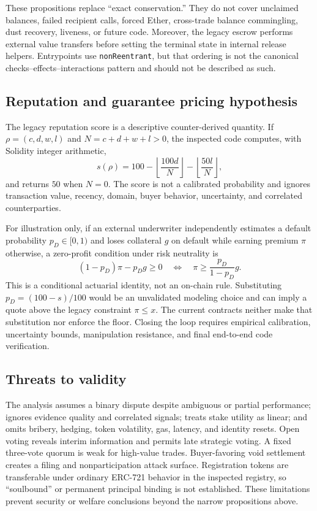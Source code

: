 These propositions replace ``exact conservation.'' They do not cover unclaimed balances, failed
recipient calls, forced Ether, cross-trade balance commingling, dust recovery, liveness, or future
code. Moreover, the legacy escrow performs external value transfers before setting the terminal
state in internal release helpers. Entrypoints use \texttt{nonReentrant}, but that ordering is not the
canonical checks--effects--interactions pattern and should not be described as such.

\subsection{Reputation and guarantee pricing hypothesis}
\label{sec:pricing}

The legacy reputation score is a descriptive counter-derived quantity. If
$\rho=(c,d,w,l)$ and $N=c+d+w+l>0$, the inspected code computes, with Solidity integer arithmetic,
\[
  s(\rho)=100-\left\lfloor\frac{100d}{N}\right\rfloor
             -\left\lfloor\frac{50l}{N}\right\rfloor,
\]
and returns $50$ when $N=0$. The score is not a calibrated probability and ignores transaction
value, recency, domain, buyer behavior, uncertainty, and correlated counterparties.

For illustration only, if an external underwriter independently estimates a default probability
$p_D\in[0,1)$ and loses collateral $g$ on default while earning premium $\pi$ otherwise, a zero-profit
condition under risk neutrality is
\[
 (1-p_D)\pi-p_Dg\ge0
 \quad\Longleftrightarrow\quad
 \pi\ge\frac{p_D}{1-p_D}g.
\]
This is a conditional actuarial identity, not an on-chain rule. Substituting
$p_D=(100-s)/100$ would be an unvalidated modeling choice and can imply a quote above the legacy
constraint $\pi\le x$. The current contracts neither make that substitution nor enforce the floor.
Closing the loop requires empirical calibration, uncertainty bounds, manipulation resistance, and
final end-to-end code verification.

\subsection{Threats to validity}
The analysis assumes a binary dispute despite ambiguous or partial performance; ignores evidence
quality and correlated signals; treats stake utility as linear; and omits bribery, hedging, token
volatility, gas, latency, and identity resets. Open voting reveals interim information and permits
late strategic voting. A fixed three-vote quorum is weak for high-value trades. Buyer-favoring void
settlement creates a filing and nonparticipation attack surface. Registration tokens are transferable
under ordinary ERC-721 behavior in the inspected registry, so ``soulbound'' or permanent principal
binding is not established. These limitations prevent security or welfare conclusions beyond the
narrow propositions above.
